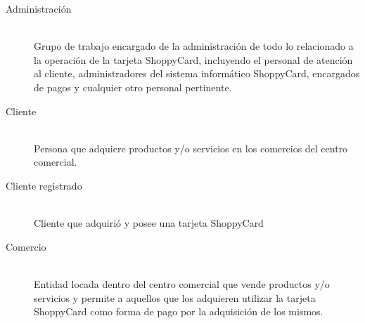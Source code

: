 \begin{description}

\item[Administración] \hfill \\
Grupo de trabajo encargado de la administración de todo lo relacionado a la
operación de la tarjeta ShoppyCard, incluyendo el personal de atención al
cliente, administradores del sistema informático ShoppyCard, encargados de pagos
y cualquier otro personal pertinente.

\item[Cliente] \hfill \\
Persona que adquiere productos y/o servicios en los comercios del centro
comercial.

\item[Cliente registrado] \hfill \\
Cliente que adquirió y posee una tarjeta ShoppyCard

\item[Comercio] \hfill \\
Entidad locada dentro del centro comercial que vende productos y/o servicios y
permite a aquellos que los adquieren utilizar la tarjeta ShoppyCard como forma
de pago por la adquisición de los mismos.

\end{description}
